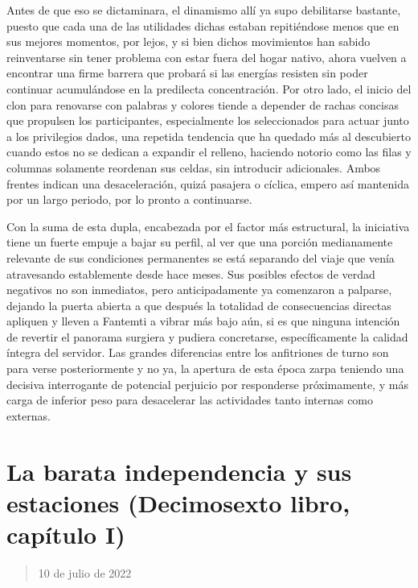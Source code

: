 \documentclass[
]{book}
\begin{document}
Antes de que eso se dictaminara, el dinamismo allí ya supo debilitarse bastante, puesto que cada una de las utilidades dichas estaban repitiéndose menos que en sus mejores momentos, por lejos, y si bien dichos movimientos han sabido reinventarse sin tener problema con estar fuera del hogar nativo, ahora vuelven a encontrar una firme barrera que probará si las energías resisten sin poder continuar acumulándose en la predilecta concentración. Por otro lado, el inicio del clon para renovarse con palabras y colores tiende a depender de rachas concisas que propulsen los participantes, especialmente los seleccionados para actuar junto a los privilegios dados, una repetida tendencia que ha quedado más al descubierto cuando estos no se dedican a expandir el relleno, haciendo notorio como las filas y columnas solamente reordenan sus celdas, sin introducir adicionales. Ambos frentes indican una desaceleración, quizá pasajera o cíclica, empero así mantenida por un largo periodo, por lo pronto a continuarse.

Con la suma de esta dupla, encabezada por el factor más estructural, la iniciativa tiene un fuerte empuje a bajar su perfil, al ver que una porción medianamente relevante de sus condiciones permanentes se está separando del viaje que venía atravesando establemente desde hace meses. Sus posibles efectos de verdad negativos no son inmediatos, pero anticipadamente ya comenzaron a palparse, dejando la puerta abierta a que después la totalidad de consecuencias directas apliquen y lleven a Fantemti a vibrar más bajo aún, si es que ninguna intención de revertir el panorama surgiera y pudiera concretarse, específicamente la calidad íntegra del servidor. Las grandes diferencias entre los anfitriones de turno son para verse posteriormente y no ya, la apertura de esta época zarpa teniendo una decisiva interrogante de potencial perjuicio por responderse próximamente, y más carga de inferior peso para desacelerar las actividades tanto internas como externas.

\hypertarget{la-barata-independencia-y-sus-estaciones-decimosexto-libro-capuxedtulo-i}{%
\section{La barata independencia y sus estaciones (Decimosexto libro, capítulo I)}\label{la-barata-independencia-y-sus-estaciones-decimosexto-libro-capuxedtulo-i}}

\begin{quote}
10 de julio de 2022
\end{quote}
\end{document}
